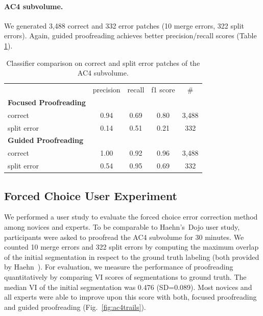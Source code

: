 \paragraph{AC4 subvolume.} We generated 3,488 correct and 332 error patches (10 merge errors, 322 split errors). Again, guided proofreading achieves better precision/recall scores (Table \ref{tab:prac4}).

\begin{table}[h]
\caption{Classifier comparison on correct and split error patches of the AC4 subvolume.}%

\small{
\begin{tabular}{l|c|c|c|c}

 & precision & recall & f1 score & \# \\ 
\textbf{Focused Proofreading} & ~ & ~ & ~ & ~ \\ 
correct & 0.94 & 0.69 & 0.80 & 3,488 \\ 
split error & 0.14 & 0.51 & 0.21 & 332 \\ 
\textbf{Guided Proofreading} & ~ & ~ & ~ & ~ \\ 
correct & 1.00 & 0.92 & 0.96 & 3,488 \\ 
split error & 0.54 & 0.95 & 0.69 & 332 \\ 
\end{tabular} 
}
\label{tab:prac4}
\end{table}

\subsection{Forced Choice User Experiment}
We performed a user study to evaluate the forced choice error correction method among novices and experts. To be comparable to Haehn's~\etal Dojo user study, participants were asked to proofread the AC4 subvolume for 30 minutes. We counted 10 merge errors and 322 split errors by computing the maximum overlap of the initial segmentation in respect to the ground truth labeling (both provided by Haehn~\etal). For evaluation, we measure the performance of proofreading quantitatively by comparing VI scores of segmentations to ground truth. The median VI of the initial segmentation was 0.476 (SD=0.089). Most novices and all experts were able to improve upon this score with both, focused proofreading and guided proofreading (Fig.~\ref{fig:ac4trails}).

